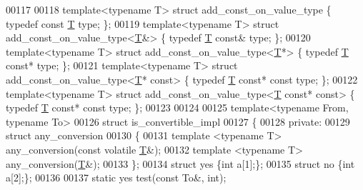 \begin{DoxyCode}
00117 
00118 \textcolor{keyword}{template}<\textcolor{keyword}{typename} T> \textcolor{keyword}{struct }add\_const\_on\_value\_type            \{ \textcolor{keyword}{typedef} \textcolor{keyword}{const} \hyperlink{group___sparse_core___module_class_eigen_1_1_triplet}{T} type;  \};
00119 \textcolor{keyword}{template}<\textcolor{keyword}{typename} T> \textcolor{keyword}{struct }add\_const\_on\_value\_type<\hyperlink{group___sparse_core___module_class_eigen_1_1_triplet}{T}&>        \{ \textcolor{keyword}{typedef} \hyperlink{group___sparse_core___module_class_eigen_1_1_triplet}{T} \textcolor{keyword}{const}& type; \};
00120 \textcolor{keyword}{template}<\textcolor{keyword}{typename} T> \textcolor{keyword}{struct }add\_const\_on\_value\_type<\hyperlink{group___sparse_core___module_class_eigen_1_1_triplet}{T}*>        \{ \textcolor{keyword}{typedef} \hyperlink{group___sparse_core___module_class_eigen_1_1_triplet}{T} \textcolor{keyword}{const}* type; \};
00121 \textcolor{keyword}{template}<\textcolor{keyword}{typename} T> \textcolor{keyword}{struct }add\_const\_on\_value\_type<\hyperlink{group___sparse_core___module_class_eigen_1_1_triplet}{T}* \textcolor{keyword}{const}>  \{ \textcolor{keyword}{typedef} \hyperlink{group___sparse_core___module_class_eigen_1_1_triplet}{T} \textcolor{keyword}{const}* \textcolor{keyword}{const} type; \};
00122 \textcolor{keyword}{template}<\textcolor{keyword}{typename} T> \textcolor{keyword}{struct }add\_const\_on\_value\_type<\hyperlink{group___sparse_core___module_class_eigen_1_1_triplet}{T} const* \textcolor{keyword}{const}>  \{ \textcolor{keyword}{typedef} 
      \hyperlink{group___sparse_core___module_class_eigen_1_1_triplet}{T} \textcolor{keyword}{const}* \textcolor{keyword}{const} type; \};
00123 
00124 
00125 \textcolor{keyword}{template}<\textcolor{keyword}{typename} From, \textcolor{keyword}{typename} To>
00126 \textcolor{keyword}{struct }is\_convertible\_impl
00127 \{
00128 \textcolor{keyword}{private}:
00129   \textcolor{keyword}{struct }any\_conversion
00130   \{
00131     \textcolor{keyword}{template} <\textcolor{keyword}{typename} T> any\_conversion(\textcolor{keyword}{const} \textcolor{keyword}{volatile} \hyperlink{group___sparse_core___module_class_eigen_1_1_triplet}{T}&);
00132     \textcolor{keyword}{template} <\textcolor{keyword}{typename} T> any\_conversion(\hyperlink{group___sparse_core___module_class_eigen_1_1_triplet}{T}&);
00133   \};
00134   \textcolor{keyword}{struct }yes \{\textcolor{keywordtype}{int} a[1];\};
00135   \textcolor{keyword}{struct }no  \{\textcolor{keywordtype}{int} a[2];\};
00136 
00137   \textcolor{keyword}{static} yes test(\textcolor{keyword}{const} To&, \textcolor{keywordtype}{int});

\end{DoxyCode}
